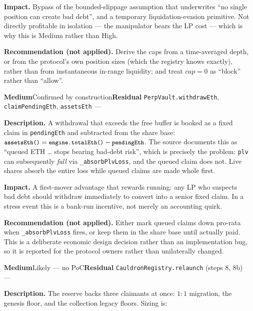 \documentclass[10pt,a4paper]{article}
\newcommand{\sev}[2]{\textcolor{#1}{\textbf{#2}}}
\newcommand{\SevMed}{\sev{med}{Medium}}
\newcommand{\Residual}{\textcolor{med}{\textbf{Residual}}}
\newcommand{\code}[1]{\texttt{\small #1}}
\begin{document}
\textbf{Impact.} Bypass of the bounded-slippage assumption that underwrites ``no single
position can create bad debt'', and a temporary liquidation-evasion primitive. Not
directly profitable in isolation --- the manipulator bears the LP cost --- which is why this
is Medium rather than High.

\textbf{Recommendation (not applied).} Derive the caps from a time-averaged depth, or from
the protocol's own position sizes (which the registry knows exactly), rather than from
instantaneous in-range liquidity; and treat $\textit{cap} = 0$ as ``block'' rather than
``allow''.

{\SevMed}{Confirmed by construction}{\Residual}
{\code{PerpVault.withdrawEth}, \code{claimPendingEth}, \code{assetsEth}}
{---}

\textbf{Description.} A withdrawal that exceeds the free buffer is booked as a fixed claim
in \code{pendingEth} and subtracted from the share base:
$\code{assetsEth()} = \code{engine.totalEth()} - \code{pendingEth}$. The source documents
this as ``queued ETH \ldots{} stops bearing bad-debt risk'', which is precisely the problem:
\code{plv} can subsequently \emph{fall} via \code{\_absorbPlvLoss}, and the queued claim
does not. Live shares absorb the entire loss while queued claims are made whole first.

\textbf{Impact.} A first-mover advantage that rewards running: any LP who suspects bad debt
should withdraw immediately to convert into a senior fixed claim. In a stress event this is
a bank-run incentive, not merely an accounting quirk.

\textbf{Recommendation (not applied).} Either mark queued claims down pro-rata when
\code{\_absorbPlvLoss} fires, or keep them in the share base until actually paid. This is a
deliberate economic design decision rather than an implementation bug, so it is reported
for the protocol owners rather than unilaterally changed.

{\SevMed}{Likely --- no PoC}{\Residual}
{\code{CauldronRegistry.relaunch} (steps 8, 8b)}
{---}

\textbf{Description.} The reserve backs three claimants at once: $1{:}1$ migration, the
genesis floor, and the collection legacy floors. Sizing is:
\end{document}
